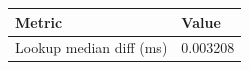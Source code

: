\begin{tabular}{ll}
\hline
Metric & Value \\
\hline
Lookup median diff (ms) & 0.003208 \\
\hline
\end{tabular}
